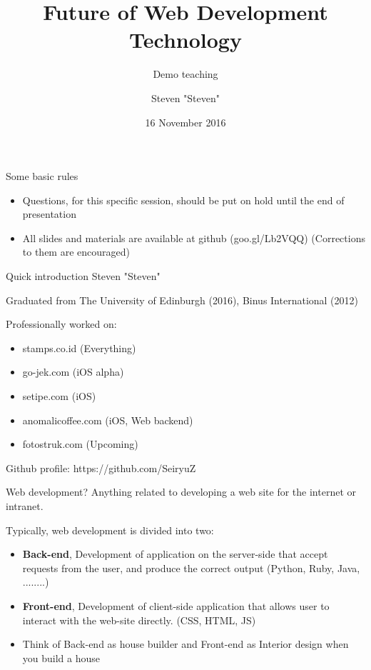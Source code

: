 \documentclass{beamer}
\title{Future of Web Development Technology}
\subtitle{Demo teaching}
\date{16 November 2016}
\author{Steven "Steven"}
\institute{BINUS INTERNATIONAL}
\begin{document}
  \maketitle
  
  \begin{frame}{Some basic rules}
  	\begin{itemize}
		\item Questions, for this specific session, should be put on hold until the end of presentation
		\item All slides and materials are available at github (goo.gl/Lb2VQQ) (Corrections to them are encouraged)
	\end{itemize}
  \end{frame}
  
  \begin{frame}{Quick introduction}
	Steven "Steven"
	
	Graduated from The University of Edinburgh (2016), Binus International (2012)
	
	Professionally worked on:
	\begin{itemize}
		\item stamps.co.id  (Everything)
		\item go-jek.com (iOS alpha)
		\item setipe.com  (iOS)
		\item anomalicoffee.com (iOS, Web backend)
		\item fotostruk.com (Upcoming)
	\end{itemize}
	
	Github profile: https://github.com/SeiryuZ
  \end{frame}
  
    \begin{frame}{Web development?}
	Anything related to developing a web site for the internet or intranet.
	
	\pause
	Typically, web development is divided into two:
	
	\pause
	\begin{itemize}[<+->]
		\item \textbf{Back-end}, Development of application on the server-side that accept requests from the user, and produce the correct output (Python, Ruby, Java, ........)  
		
		\item \textbf{Front-end}, Development of client-side application that allows user to interact with the web-site directly. (CSS, HTML, JS)
		
		\item Think of Back-end as house builder and Front-end as Interior design when you build a house
	\end{itemize}
    \end{frame}
\end{document}
